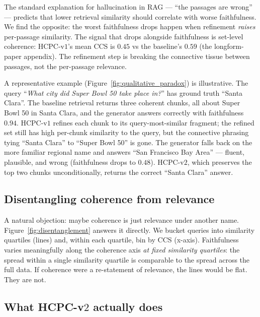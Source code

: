 The standard explanation for hallucination in RAG --- ``the passages
are wrong'' --- predicts that lower retrieval similarity should
correlate with worse faithfulness. We find the opposite: the worst
faithfulness drops happen when refinement \emph{raises} per-passage
similarity. The signal that drops alongside faithfulness is set-level
coherence: HCPC-v$1$'s mean CCS is $0.45$ vs the baseline's $0.59$
(the longform-paper appendix). The refinement step is breaking
the connective tissue between passages, not the per-passage relevance.



A representative example (Figure~\ref{fig:qualitative_paradox}) is
illustrative. The query ``\emph{What city did Super Bowl 50 take place
in?}'' has ground truth ``Santa Clara''. The baseline retrieval
returns three coherent chunks, all about Super Bowl 50 in Santa
Clara, and the generator answers correctly with faithfulness $0.94$.
HCPC-v$1$ refines each chunk to its query-most-similar fragment;
the refined set still has high per-chunk similarity to the query, but
the connective phrasing tying ``Santa Clara'' to ``Super Bowl 50'' is
gone. The generator falls back on the more familiar regional name and
answers ``San Francisco Bay Area'' --- fluent, plausible, and wrong
(faithfulness drops to $0.48$). HCPC-v$2$, which preserves the top
two chunks unconditionally, returns the correct ``Santa Clara'' answer.

\subsection{Disentangling coherence from relevance}
\label{sec:paradox:disentangle}



A natural objection: maybe coherence is just relevance under another
name. Figure~\ref{fig:disentanglement} answers it directly. We bucket
queries into similarity quartiles (lines) and, within each quartile,
bin by CCS (x-axis). Faithfulness varies meaningfully along the
coherence axis \emph{at fixed similarity quartiles}: the spread within
a single similarity quartile is comparable to the spread across the
full data. If coherence were a re-statement of relevance, the lines
would be flat. They are not.


\subsection{What HCPC-v$2$ actually does}
\label{sec:paradox:v2_intuition}

